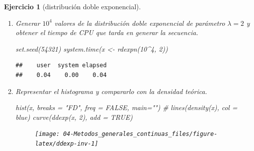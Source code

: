 \documentclass[
]{book}
\newenvironment{Shaded}{\begin{snugshade}}{\end{snugshade}}
\newcommand{\AttributeTok}[1]{\textcolor[rgb]{0.77,0.63,0.00}{#1}}
\newcommand{\CommentTok}[1]{\textcolor[rgb]{0.56,0.35,0.01}{\textit{#1}}}
\newcommand{\ConstantTok}[1]{\textcolor[rgb]{0.00,0.00,0.00}{#1}}
\newcommand{\ControlFlowTok}[1]{\textcolor[rgb]{0.13,0.29,0.53}{\textbf{#1}}}
\newcommand{\DecValTok}[1]{\textcolor[rgb]{0.00,0.00,0.81}{#1}}
\newcommand{\FunctionTok}[1]{\textcolor[rgb]{0.00,0.00,0.00}{#1}}
\newcommand{\NormalTok}[1]{#1}
\newcommand{\OtherTok}[1]{\textcolor[rgb]{0.56,0.35,0.01}{#1}}
\newcommand{\SpecialCharTok}[1]{\textcolor[rgb]{0.00,0.00,0.00}{#1}}
\newcommand{\StringTok}[1]{\textcolor[rgb]{0.31,0.60,0.02}{#1}}
\theoremstyle{break}
\newtheorem{exercise}{Ejercicio}[chapter]
\theoremstyle{nonumberplain}
\begin{document}
\begin{exercise}[distribución doble exponencial]
\begin{enumerate}
\begin{Shaded}
\begin{Highlighting}[]
\NormalTok{rdexpn }\OtherTok{\textless{}{-}} \ControlFlowTok{function}\NormalTok{(}\AttributeTok{n =} \DecValTok{1000}\NormalTok{, }\AttributeTok{lambda =} \DecValTok{1}\NormalTok{) \{}
\CommentTok{\# Simulación n valores de doble exponencial}
\NormalTok{    x }\OtherTok{\textless{}{-}} \FunctionTok{numeric}\NormalTok{(n)}
    \ControlFlowTok{for}\NormalTok{(i }\ControlFlowTok{in} \DecValTok{1}\SpecialCharTok{:}\NormalTok{n) x[i]}\OtherTok{\textless{}{-}}\FunctionTok{rdexp}\NormalTok{(lambda)}
    \FunctionTok{return}\NormalTok{(x)}
\NormalTok{\}}
\end{Highlighting}
\end{Shaded}
\item
  Generar \(10^{4}\) valores de la distribución doble exponencial de
  parámetro \(\lambda=2\) y obtener el tiempo de CPU que tarda en
  generar la secuencia.

\begin{Shaded}
\begin{Highlighting}[]
\FunctionTok{set.seed}\NormalTok{(}\DecValTok{54321}\NormalTok{)}
\FunctionTok{system.time}\NormalTok{(x }\OtherTok{\textless{}{-}} \FunctionTok{rdexpn}\NormalTok{(}\DecValTok{10}\SpecialCharTok{\^{}}\DecValTok{4}\NormalTok{, }\DecValTok{2}\NormalTok{))}
\end{Highlighting}
\end{Shaded}

\begin{verbatim}
##    user  system elapsed 
##    0.04    0.00    0.04
\end{verbatim}
\item
  Representar el histograma y compararlo con la densidad teórica.

\begin{Shaded}
\begin{Highlighting}[]
\FunctionTok{hist}\NormalTok{(x, }\AttributeTok{breaks =} \StringTok{"FD"}\NormalTok{, }\AttributeTok{freq =} \ConstantTok{FALSE}\NormalTok{, }\AttributeTok{main=}\StringTok{""}\NormalTok{)}
\CommentTok{\# lines(density(x), col = \textquotesingle{}blue\textquotesingle{})}
\FunctionTok{curve}\NormalTok{(}\FunctionTok{ddexp}\NormalTok{(x, }\DecValTok{2}\NormalTok{), }\AttributeTok{add =} \ConstantTok{TRUE}\NormalTok{)}
\end{Highlighting}
\end{Shaded}

  \begin{figure}[!htb]

  {\centering \texttt{[image: 04-Metodos\_generales\_continuas\_files/figure-latex/ddexp-inv-1]} 

}
\end{figure}
\end{enumerate}
\end{exercise}
\end{document}
